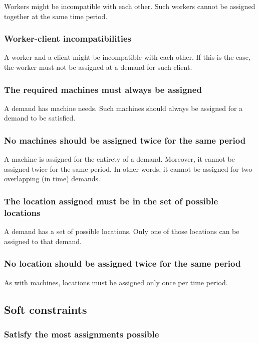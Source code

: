 \documentclass[../thesis.tex]{subfiles}
\begin{document}
Workers might be incompatible with each other. Such workers cannot
be assigned together at the same time period.

\subsubsection{Worker-client incompatibilities}

A worker and a client might be incompatible with each other. 
If this is the case, the worker must not be assigned at a demand for such client.

\subsubsection{The required machines must always be assigned}

A demand has machine needs. Such machines should always be assigned 
for a demand to be satisfied.

\subsubsection{No machines should be assigned twice for the same period}

A machine is assigned for the entirety of a demand. Moreover, it cannot be assigned twice 
for the same period. In other words, it cannot be assigned for two overlapping (in time) demands.


\subsubsection{The location assigned must be in the set of possible locations}

A demand has a set of possible locations. Only one of those locations can be assigned 
to that demand.

\subsubsection{No location should be assigned twice for the same period}

As with machines, locations must be assigned only once per time period.


\subsection{Soft constraints}

\subsubsection{Satisfy the most assignments possible}
\end{document}
